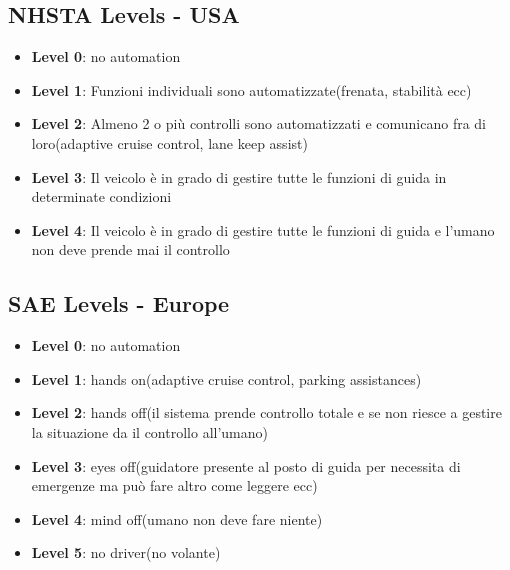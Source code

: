 \subsection{NHSTA Levels - USA}
\begin{itemize}
  \item \textbf{Level 0}: no automation
  \item \textbf{Level 1}: Funzioni individuali sono automatizzate(frenata, stabilità ecc)
  \item \textbf{Level 2}: Almeno 2 o più controlli sono automatizzati e comunicano fra di loro(adaptive cruise control, lane keep assist)
  \item \textbf{Level 3}: Il veicolo è in grado di gestire tutte le funzioni di guida in determinate condizioni
  \item \textbf{Level 4}: Il veicolo è in grado di gestire tutte le funzioni di guida e l'umano non deve prende mai il controllo
\end{itemize}


\subsection{SAE Levels - Europe}

\begin{itemize}
  \item \textbf{Level 0}: no automation
  \item \textbf{Level 1}: hands on(adaptive cruise control, parking assistances)
  \item \textbf{Level 2}: hands off(il sistema prende controllo totale e se non riesce a gestire la situazione da il controllo all'umano)
      \item \textbf{Level 3}: eyes off(guidatore presente al posto di guida per necessita di emergenze ma può fare altro come leggere ecc)
      \item \textbf{Level 4}: mind off(umano non deve fare niente)
      \item \textbf{Level 5}: no driver(no volante)
\end{itemize}
